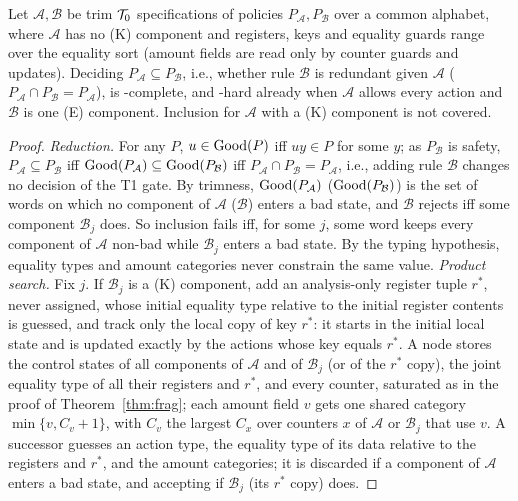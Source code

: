 \begin{proposition}\label{prop:incl}
Let $\mathcal A,\mathcal B$ be trim $\mathcal{T}_0$ specifications of policies $P_{\mathcal A},P_{\mathcal B}$ over a common alphabet, where $\mathcal A$ has no (K) component
and registers, keys and equality guards range over the equality sort (amount fields are read only by counter guards and updates).
Deciding $P_{\mathcal A}\subseteq P_{\mathcal B}$, i.e., whether rule $\mathcal B$ is redundant given $\mathcal A$ ($P_{\mathcal A}\cap P_{\mathcal B}=P_{\mathcal A}$), is \PSPACE-complete,
and \PSPACE-hard already when $\mathcal A$ allows every action and $\mathcal B$ is one (E) component. Inclusion for $\mathcal A$ with a (K) component is not covered.
\end{proposition}
\begin{proof}
\emph{Reduction.} For any $P$, $u\in\mathrm{Good}(P)$ iff $uy\in P$ for some $y$; as $P_{\mathcal B}$ is safety, $P_{\mathcal A}\subseteq P_{\mathcal B}$ iff
$\mathrm{Good}(P_{\mathcal A})\subseteq\mathrm{Good}(P_{\mathcal B})$ iff $P_{\mathcal A}\cap P_{\mathcal B}=P_{\mathcal A}$, i.e., adding rule $\mathcal B$ changes no decision of the T1 gate.
By trimness, $\mathrm{Good}(P_{\mathcal A})$ ($\mathrm{Good}(P_{\mathcal B})$) is the set of words on which no component of $\mathcal A$ ($\mathcal B$) enters a bad state, and
$\mathcal B$ rejects iff some component $\mathcal B_j$ does. So inclusion fails iff, for some $j$, some word keeps every component of $\mathcal A$ non-bad
while $\mathcal B_j$ enters a bad state. By the typing hypothesis, equality types and amount categories never constrain the same value.
\emph{Product search.} Fix $j$. If $\mathcal B_j$ is a (K) component, add an analysis-only register tuple $r^\ast$, never assigned, whose initial
equality type relative to the initial register contents is guessed, and track only the local copy of key $r^\ast$: it starts in the initial local
state and is updated exactly by the actions whose key equals $r^\ast$. A node stores the control states of all components of $\mathcal A$ and of
$\mathcal B_j$ (or of the $r^\ast$ copy), the joint equality type of all their registers and $r^\ast$, and every counter, saturated as in the proof of
Theorem~\ref{thm:frag}; each amount field $v$ gets one shared category $\min\{v,C_v+1\}$, with $C_v$ the largest $C_x$ over counters $x$ of
$\mathcal A$ or $\mathcal B_j$ that use $v$. A successor guesses an action type, the equality type of its data relative to the registers and $r^\ast$, and
the amount categories; it is discarded if a component of $\mathcal A$ enters a bad state, and accepting if $\mathcal B_j$ (its $r^\ast$ copy) does.

\end{proof}
